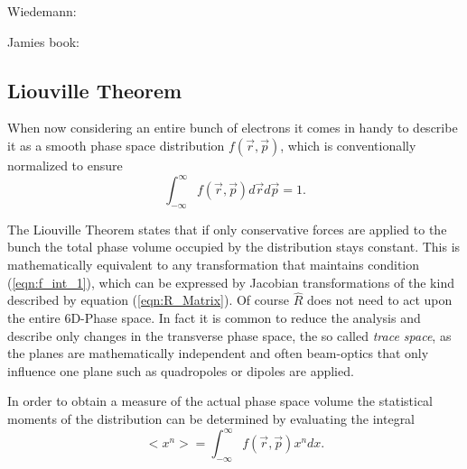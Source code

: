 Wiedemann:\cite{Wiedemann_accelerator}


 Jamies book: \cite{Book_Fundamentals_Rosenzweig}
\subsection{Liouville Theorem}
When now considering an entire bunch of electrons it comes in handy to describe it as a smooth phase space distribution
$f(\vec{r},\vec{p})$, which is conventionally normalized to ensure
\begin{equation}
\label{eqn:f_int_1}
\int^{\infty}_{-\infty}f(\vec{r},\vec{p})d\vec{r}d\vec{p}=1 .
\end{equation}

The Liouville Theorem states that if only conservative forces are applied to the bunch the total phase volume occupied by the distribution stays constant. This is mathematically equivalent to any transformation that maintains condition (\ref{eqn:f_int_1}), which can be expressed by Jacobian transformations of the kind described by equation (\ref{eqn:R_Matrix}).
Of course $\hat{R}$ does not need to act upon the entire 6D-Phase space. In fact it is common to reduce the analysis and describe only changes in the transverse phase space, the so called \textit{trace space}, as the planes are mathematically independent and often beam-optics that only influence one plane such as quadropoles or dipoles are applied.

In order to obtain a measure of the actual phase space volume the statistical moments of the distribution can be determined by evaluating the integral 
\begin{equation}
<x^n>=\int_{-\infty}^{\infty}f(\vec{r},\vec{p})x^n dx.
\end{equation}
